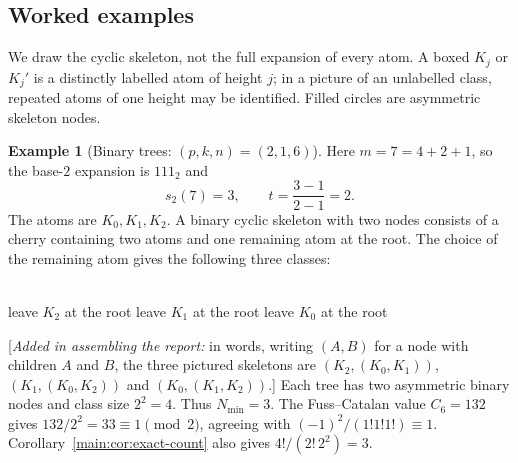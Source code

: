 \documentclass[11pt]{article}
\theoremstyle{definition}
\newtheorem{example}[theorem]{Example}
\theoremstyle{remark}
\numberwithin{equation}{section}
\numberwithin{figure}{section}
\newcommand{\assembler}[1]{[\emph{Added in assembling the report:} #1]}
\begin{document}
\subsection{Worked examples}\label{main:sec:examples}
We draw the cyclic skeleton, not the full expansion of every atom.  A boxed $K_j$ or $K_j'$ is a distinctly labelled atom of height $j$; in a picture of an unlabelled class, repeated atoms of one height may be identified.  Filled circles are asymmetric skeleton nodes.
\begin{example}[Binary trees: $(p,k,n)=(2,1,6)$]\label{main:ex:binary}
Here $m=7=4+2+1$, so the base-$2$ expansion is $111_2$ and
\[
 s_2(7)=3,\qquad t=\frac{3-1}{2-1}=2.
\]
The atoms are $K_0,K_1,K_2$.  A binary cyclic skeleton with two nodes consists of a cherry containing two atoms and one remaining atom at the root.  The choice of the remaining atom gives the following three classes:
\begin{center}
\hfill
{}
\hfill
{}\\[3mm]
leave $K_2$ at the root\qquad
leave $K_1$ at the root\qquad
leave $K_0$ at the root
\end{center}
\assembler{in words, writing $(A,B)$ for a node with children $A$ and $B$, the three pictured skeletons are
$(K_2,(K_0,K_1))$, $(K_1,(K_0,K_2))$ and $(K_0,(K_1,K_2))$.}
Each tree has two asymmetric binary nodes and class size $2^2=4$.  Thus $N_{\min}=3$.  The Fuss--Catalan value $C_6=132$ gives $132/2^2=33\equiv1\pmod2$, agreeing with $(-1)^2/(1!1!1!)\equiv1$.  Corollary~\ref{main:cor:exact-count} also gives $4!/(2!\,2^2)=3$.
\end{example}
\end{document}
